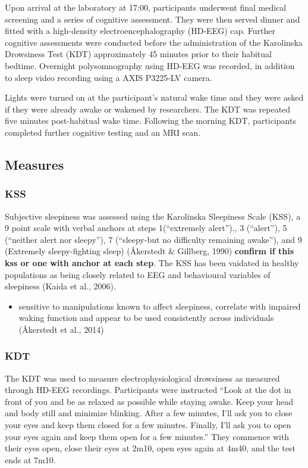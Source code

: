 \documentclass[
]{article}
\providecommand{\tightlist}{%
  \setlength{\itemsep}{0pt}\setlength{\parskip}{0pt}}
\begin{document}
Upon arrival at the laboratory at 17:00, participants underwent final
medical screening and a series of cognitive assessment. They were then
served dinner and fitted with a high-density electroencephalography
(HD-EEG) cap. Further cognitive assessments were conducted before the
administration of the Karolinska Drowsiness Test (KDT) approximately 45
minutes prior to their habitual bedtime. Overnight polysomnography using
HD-EEG was recorded, in addition to sleep video recording using a AXIS
P3225-LV camera.

Lights were turned on at the participant's natural wake time and they
were asked if they were already awake or wakened by researchers. The KDT
was repeated five minutes post-habitual wake time. Following the morning
KDT, participants completed further cognitive testing and an MRI scan.

\subsection{Measures}\label{measures}

\subsubsection{KSS}\label{kss}

Subjective sleepiness was assessed using the Karolinska Sleepiness Scale
(KSS), a 9 point scale with verbal anchors at steps 1(``extremely
alert'')., 3 (``alert''), 5 (``neither alert nor sleepy''), 7
(``sleepy-but no difficulty remaining awake''), and 9 (Extremely
sleepy-fighting sleep) (Åkerstedt \& Gillberg, 1990) \textbf{confirm if
this kss or one with anchor at each step}. The KSS has been vaidated in
healthy populations as being closely related to EEG and behavioural
variables of sleepiness (Kaida et al., 2006).

\begin{itemize}
\tightlist
\item
  sensitive to manipulations known to affect sleepiness, correlate with
  impaired waking function and appear to be used consistently across
  individuals (Åkerstedt et al., 2014)
\end{itemize}

\subsubsection{KDT}\label{kdt}

The KDT was used to measure electrophysiological drowsiness as measured
through HD-EEG recordings. Participants were instructed ``Look at the
dot in front of you and be as relaxed as possible while staying awake.
Keep your head and body still and minimize blinking. After a few
minutes, I'll ask you to close your eyes and keep them closed for a few
minutes. Finally, I'll ask you to open your eyes again and keep them
open for a few minutes.'' They commence with their eyes open, close
their eyes at 2m10, open eyes again at 4m40, and the test ends at 7m10.
\end{document}

